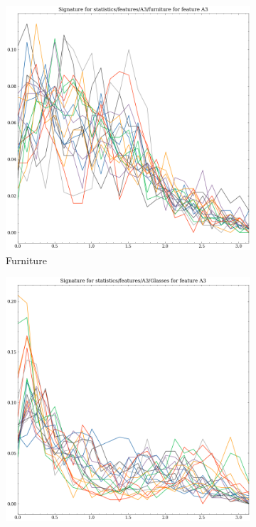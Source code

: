 \begin{figure}[ht]
    \begin{subfigure}[b]{0.23\textwidth}
        \includegraphics[width=\textwidth]{assets/feature_extraction/A3/furniture.png}
        \caption{Furniture}
        \label{fig:features-statistics-A3-m}    
    \end{subfigure}
    \hfill
    \begin{subfigure}[b]{0.23\textwidth}
        \includegraphics[width=\textwidth]{assets/feature_extraction/A3/Glasses.png}

\end{subfigure}
\end{figure}
